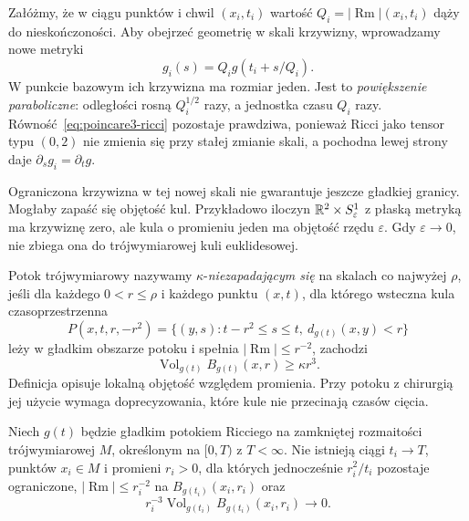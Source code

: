 Załóżmy, że w ciągu punktów i chwil $(x_i,t_i)$
wartość $Q_i=|\operatorname{Rm}|(x_i,t_i)$
dąży do nieskończoności. Aby obejrzeć geometrię
w skali krzywizny, wprowadzamy nowe metryki
\begin{equation}\label{eq:poincare3-rescale}
 g_i(s)=Q_i g(t_i+s/Q_i).
\end{equation}
W punkcie bazowym ich krzywizna ma rozmiar jeden.
Jest to \emph{powiększenie paraboliczne}:
odległości rosną $Q_i^{1/2}$ razy, a jednostka
czasu $Q_i$ razy. Równość~\eqref{eq:poincare3-ricci}
pozostaje prawdziwa, ponieważ Ricci jako tensor
typu $(0,2)$ nie zmienia się przy stałej zmianie
skali, a pochodna lewej strony daje
$\partial_sg_i=\partial_tg$.

Ograniczona krzywizna w tej nowej skali nie
gwarantuje jeszcze gładkiej granicy. Mogłaby
zapaść się objętość kul. Przykładowo iloczyn
$\mathbb{R}^2\times S^1_\varepsilon$ z płaską metryką
ma krzywiznę zero, ale kula o promieniu jeden
ma objętość rzędu $\varepsilon$. Gdy
$\varepsilon\to0$, nie zbiega ona do
trójwymiarowej kuli euklidesowej.

\begin{definicja}
\label{def:poincare3-noncollapsing}
Potok trójwymiarowy nazywamy
$\kappa$-\emph{niezapadającym się} na skalach
co najwyżej $\rho$, jeśli dla każdego
$0<r\leq\rho$ i każdego punktu $(x,t)$,
dla którego wsteczna kula czasoprzestrzenna
\[
 P(x,t,r,-r^2)=
 \{(y,s):t-r^2\leq s\leq t,
        \ d_{g(t)}(x,y)<r\}
\]
leży w gładkim obszarze potoku i spełnia
$|\operatorname{Rm}|\leq r^{-2}$,
zachodzi
\begin{equation}\label{eq:poincare3-noncollapsing}
 \operatorname{Vol}_{g(t)}B_{g(t)}(x,r)
 \geq\kappa r^3.
\end{equation}
Definicja opisuje lokalną objętość względem
promienia. Przy potoku z chirurgią jej użycie
wymaga doprecyzowania, które kule nie przecinają
czasów cięcia.
\end{definicja}

\begin{twierdzenie}
\label{thm:poincare3-perelman-noncollapse}
Niech $g(t)$ będzie gładkim potokiem Ricciego
na zamkniętej rozmaitości trójwymiarowej $M$, określonym
na $[0,T)$ z $T<\infty$. Nie istnieją ciągi
$t_i\to T$, punktów $x_i\in M$ i promieni
$r_i>0$, dla których jednocześnie
$r_i^2/t_i$ pozostaje ograniczone,
$|\operatorname{Rm}|\leq r_i^{-2}$
na $B_{g(t_i)}(x_i,r_i)$ oraz
\[
 r_i^{-3}\operatorname{Vol}_{g(t_i)}
 B_{g(t_i)}(x_i,r_i)\longrightarrow0.
\]
\end{twierdzenie}

